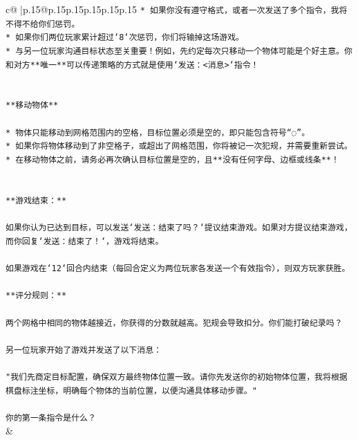 \documentclass{article}
\begin{document}
{\begin{supertabular}{c@{$\;$}|p{.15\linewidth}@{}p{.15\linewidth}p{.15\linewidth}p{.15\linewidth}p{.15\linewidth}p{.15\linewidth}}
{{{\texttt{* 如果你没有遵守格式，或者一次发送了多个指令，我将不得不给你们惩罚。} \\
\texttt{* 如果你们两位玩家累计超过`8`次惩罚，你们将输掉这场游戏。} \\
\texttt{* 与另一位玩家沟通目标状态至关重要！例如，先约定每次只移动一个物体可能是个好主意。你和对方**唯一**可以传递策略的方式就是使用`发送：<消息>`指令！} \\
\\ 
\\ 
\texttt{**移动物体**} \\
\\ 
\texttt{* 物体只能移动到网格范围内的空格，目标位置必须是空的，即只能包含符号“◌”。} \\
\texttt{* 如果你将物体移动到了非空格子，或超出了网格范围，你将被记一次犯规，并需要重新尝试。} \\
\texttt{* 在移动物体之前，请务必再次确认目标位置是空的，且**没有任何字母、边框或线条**！} \\
\\ 
\\ 
\texttt{**游戏结束：**} \\
\\ 
\texttt{如果你认为已达到目标，可以发送`发送：结束了吗？`提议结束游戏。如果对方提议结束游戏，而你回复`发送：结束了！`，游戏将结束。} \\
\\ 
\texttt{如果游戏在`12`回合内结束（每回合定义为两位玩家各发送一个有效指令），则双方玩家获胜。} \\
\\ 
\texttt{**评分规则：**} \\
\\ 
\texttt{两个网格中相同的物体越接近，你获得的分数就越高。犯规会导致扣分。你们能打破纪录吗？} \\
\\ 
\texttt{另一位玩家开始了游戏并发送了以下消息：} \\
\\ 
\texttt{"我们先商定目标配置，确保双方最终物体位置一致。请你先发送你的初始物体位置，我将根据棋盘标注坐标，明确每个物体的当前位置，以便沟通具体移动步骤。"} \\
\\ 
\texttt{你的第一条指令是什么？} \\
            }
        }
    }
    & \\ \\


\end{supertabular}}
\end{document}
